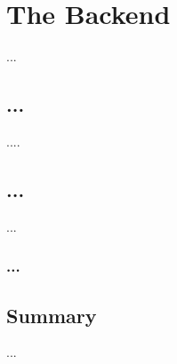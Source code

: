 \chapter{The Backend}
\label{backend}

...
\section{...}
....


\section{...}
...


\subsection{...}


\section{Summary}
...


